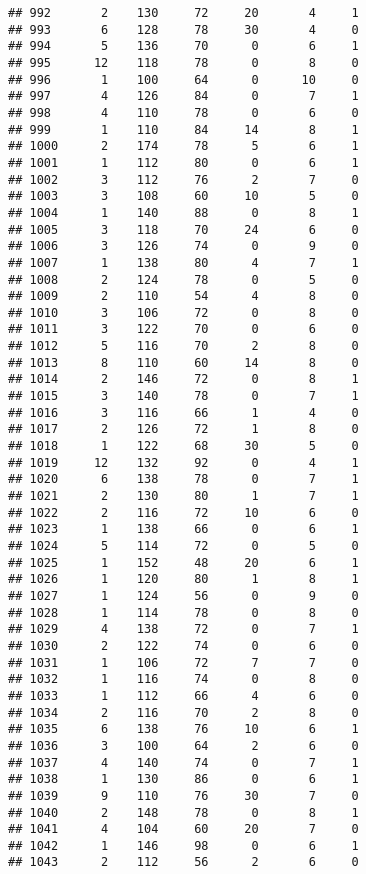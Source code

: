 \documentclass[
]{article}
\begin{document}
\begin{verbatim}
## 992       2    130     72     20       4     1
## 993       6    128     78     30       4     0
## 994       5    136     70      0       6     1
## 995      12    118     78      0       8     0
## 996       1    100     64      0      10     0
## 997       4    126     84      0       7     1
## 998       4    110     78      0       6     0
## 999       1    110     84     14       8     1
## 1000      2    174     78      5       6     1
## 1001      1    112     80      0       6     1
## 1002      3    112     76      2       7     0
## 1003      3    108     60     10       5     0
## 1004      1    140     88      0       8     1
## 1005      3    118     70     24       6     0
## 1006      3    126     74      0       9     0
## 1007      1    138     80      4       7     1
## 1008      2    124     78      0       5     0
## 1009      2    110     54      4       8     0
## 1010      3    106     72      0       8     0
## 1011      3    122     70      0       6     0
## 1012      5    116     70      2       8     0
## 1013      8    110     60     14       8     0
## 1014      2    146     72      0       8     1
## 1015      3    140     78      0       7     1
## 1016      3    116     66      1       4     0
## 1017      2    126     72      1       8     0
## 1018      1    122     68     30       5     0
## 1019     12    132     92      0       4     1
## 1020      6    138     78      0       7     1
## 1021      2    130     80      1       7     1
## 1022      2    116     72     10       6     0
## 1023      1    138     66      0       6     1
## 1024      5    114     72      0       5     0
## 1025      1    152     48     20       6     1
## 1026      1    120     80      1       8     1
## 1027      1    124     56      0       9     0
## 1028      1    114     78      0       8     0
## 1029      4    138     72      0       7     1
## 1030      2    122     74      0       6     0
## 1031      1    106     72      7       7     0
## 1032      1    116     74      0       8     0
## 1033      1    112     66      4       6     0
## 1034      2    116     70      2       8     0
## 1035      6    138     76     10       6     1
## 1036      3    100     64      2       6     0
## 1037      4    140     74      0       7     1
## 1038      1    130     86      0       6     1
## 1039      9    110     76     30       7     0
## 1040      2    148     78      0       8     1
## 1041      4    104     60     20       7     0
## 1042      1    146     98      0       6     1
## 1043      2    112     56      2       6     0

\end{verbatim}
\end{document}
